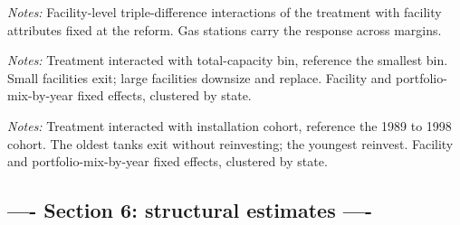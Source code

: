 \documentclass[
  12pt,
]{article}
\begin{document}
\clearpage
\null\vfill
\begin{center}
\label{tbl-fac-hte}
\vspace{6pt}
\par\vspace{10pt}
\begin{minipage}{0.85\textwidth}\small\textit{Notes:} Facility-level triple-difference interactions of the treatment with facility attributes fixed at the reform. Gas stations carry the response across margins.\end{minipage}
\end{center}
\vfill\clearpage

\clearpage
\null\vfill
\begin{center}
\label{tbl-size-hte}
\vspace{6pt}
\par\vspace{10pt}
\begin{minipage}{0.85\textwidth}\small\textit{Notes:} Treatment interacted with total-capacity bin, reference the smallest bin. Small facilities exit; large facilities downsize and replace. Facility and portfolio-mix-by-year fixed effects, clustered by state.\end{minipage}
\end{center}
\vfill\clearpage

\clearpage
\null\vfill
\begin{center}
\label{tbl-vintage-hte}
\vspace{6pt}
\par\vspace{10pt}
\begin{minipage}{0.85\textwidth}\small\textit{Notes:} Treatment interacted with installation cohort, reference the 1989 to 1998 cohort. The oldest tanks exit without reinvesting; the youngest reinvest. Facility and portfolio-mix-by-year fixed effects, clustered by state.\end{minipage}
\end{center}
\vfill\clearpage

\subsection{---- Section 6: structural estimates
----}\label{section-6-structural-estimates--}
\end{document}

